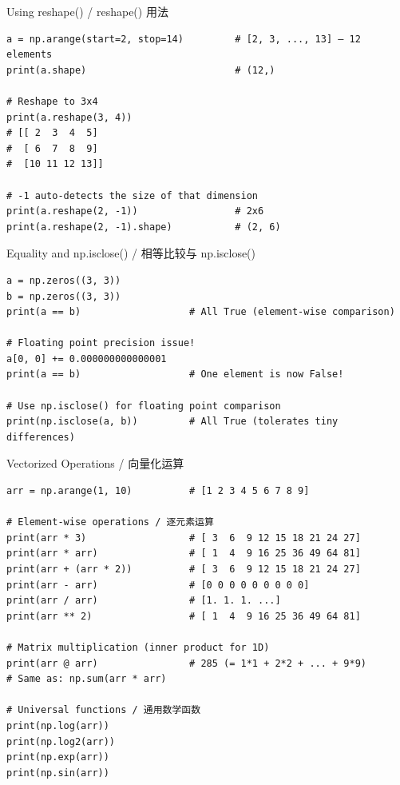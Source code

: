 \documentclass[11pt,a4paper]{report}
\begin{document}
\begin{examplebox}{Using reshape() / reshape() 用法}
\begin{lstlisting}
a = np.arange(start=2, stop=14)         # [2, 3, ..., 13] — 12 elements
print(a.shape)                          # (12,)

# Reshape to 3x4
print(a.reshape(3, 4))
# [[ 2  3  4  5]
#  [ 6  7  8  9]
#  [10 11 12 13]]

# -1 auto-detects the size of that dimension
print(a.reshape(2, -1))                 # 2x6
print(a.reshape(2, -1).shape)           # (2, 6)
\end{lstlisting}
\end{examplebox}

\begin{examplebox}{Equality and np.isclose() / 相等比较与 np.isclose()}
\begin{lstlisting}
a = np.zeros((3, 3))
b = np.zeros((3, 3))
print(a == b)                   # All True (element-wise comparison)

# Floating point precision issue!
a[0, 0] += 0.000000000000001
print(a == b)                   # One element is now False!

# Use np.isclose() for floating point comparison
print(np.isclose(a, b))         # All True (tolerates tiny differences)
\end{lstlisting}
\end{examplebox}

\begin{examplebox}{Vectorized Operations / 向量化运算}
\begin{lstlisting}
arr = np.arange(1, 10)          # [1 2 3 4 5 6 7 8 9]

# Element-wise operations / 逐元素运算
print(arr * 3)                  # [ 3  6  9 12 15 18 21 24 27]
print(arr * arr)                # [ 1  4  9 16 25 36 49 64 81]
print(arr + (arr * 2))          # [ 3  6  9 12 15 18 21 24 27]
print(arr - arr)                # [0 0 0 0 0 0 0 0 0]
print(arr / arr)                # [1. 1. 1. ...]
print(arr ** 2)                 # [ 1  4  9 16 25 36 49 64 81]

# Matrix multiplication (inner product for 1D)
print(arr @ arr)                # 285 (= 1*1 + 2*2 + ... + 9*9)
# Same as: np.sum(arr * arr)

# Universal functions / 通用数学函数
print(np.log(arr))
print(np.log2(arr))
print(np.exp(arr))
print(np.sin(arr))
\end{lstlisting}
\end{examplebox}
\end{document}
